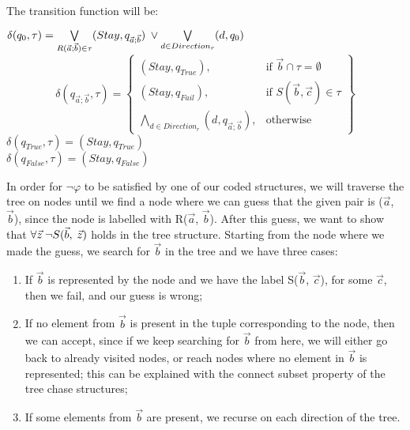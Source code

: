 \documentclass[11pt, a4paper, dvipsnames]{article}
\begin{document}
The transition function will be:
\begin{center}
$\delta(q_{0}, \tau) = \bigvee\limits_{R(\vec{a};\vec{b}) \in \tau} (Stay, q_{\vec{a};\vec{b}})\hspace{0.25em} \vee \bigvee\limits_{d \in Direction_{r}} (d, q_{0})$
\[\delta(q_{\vec{a}; \vec{b}}, \tau) = \left\{\begin{array}{lr}
        (Stay, q_{True}), & \text{if }\vec{b} \cap \tau = \emptyset \\
        (Stay, q_{Fail}), & \text{if } S(\vec{b}, \vec{c}) \in \tau \\
        \bigwedge\limits_{d \in Direction_{r}} (d, q_{\vec{a}; \vec{b}}), & \text{otherwise}
        \end{array}\right\}
  \] 
$\delta(q_{True}, \tau) = (Stay, q_{True})$\\
$\delta(q_{False}, \tau) = (Stay, q_{False})$
\end{center}
In order for $\neg \varphi$ to be satisfied by one of our coded structures, we will traverse the tree on nodes until we find a node where we can guess that the given pair is ($\vec{a}$, $\vec{b}$), since the node is labelled with R($\vec{a}$, $\vec{b}$). After this guess, we want to show that $\forall \vec{z} \hspace{0.25em} \neg S(\vec{b}, \hspace{0.25em} \vec{z})$ holds in the tree structure. Starting from the node where we made the guess, we search for $\vec{b}$ in the tree and we have three cases:
\begin{enumerate}
	\item If $\vec{b}$ is represented by the node and we have the label S($\vec{b}$, $\vec{c}$), for some $\vec{c}$, then we fail, and our guess is wrong;
	\item If no element from $\vec{b}$ is present in the tuple corresponding to the node, then we can accept, since if we keep searching for $\vec{b}$  from here, we will either go back to already visited nodes, or reach nodes where no element in $\vec{b}$ is represented; this can be explained with the connect subset property of the tree chase structures;
	\item If some elements from $\vec{b}$ are present, we recurse on each direction of the tree.
\end{enumerate}
\end{document}
